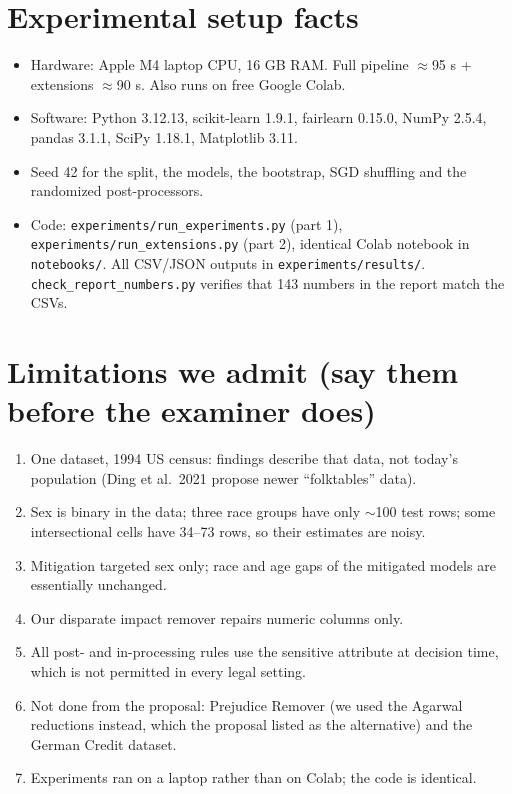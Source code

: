 \documentclass[11pt,a4paper]{article}
\begin{document}
\section{Experimental setup facts}
\begin{itemize}
  \item Hardware: Apple M4 laptop CPU, 16 GB RAM. Full pipeline $\approx$95 s + extensions $\approx$90 s. Also runs on free Google Colab.
  \item Software: Python 3.12.13, scikit-learn 1.9.1, fairlearn 0.15.0, NumPy 2.5.4, pandas 3.1.1, SciPy 1.18.1, Matplotlib 3.11.
  \item Seed 42 for the split, the models, the bootstrap, SGD shuffling and the randomized post-processors.
  \item Code: \texttt{experiments/run\_experiments.py} (part 1), \texttt{experiments/run\_extensions.py} (part 2), identical Colab notebook in \texttt{notebooks/}. All CSV/JSON outputs in \texttt{experiments/results/}. \texttt{check\_report\_numbers.py} verifies that 143 numbers in the report match the CSVs.
\end{itemize}

\section{Limitations we admit (say them before the examiner does)}
\begin{enumerate}
  \item One dataset, 1994 US census: findings describe that data, not today's population (Ding et al.\ 2021 propose newer ``folktables'' data).
  \item Sex is binary in the data; three race groups have only $\sim$100 test rows; some intersectional cells have 34--73 rows, so their estimates are noisy.
  \item Mitigation targeted sex only; race and age gaps of the mitigated models are essentially unchanged.
  \item Our disparate impact remover repairs numeric columns only.
  \item All post- and in-processing rules use the sensitive attribute at decision time, which is not permitted in every legal setting.
  \item Not done from the proposal: Prejudice Remover (we used the Agarwal reductions instead, which the proposal listed as the alternative) and the German Credit dataset.
  \item Experiments ran on a laptop rather than on Colab; the code is identical.
\end{enumerate}
\end{document}
